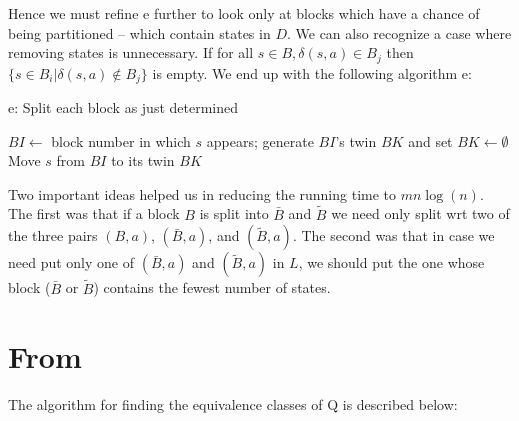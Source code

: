 Hence we must refine e further to look only at blocks which have a chance of being partitioned -- which contain states in $D$. We can also recognize a case where removing states is unnecessary. If for all $s\in B,\delta(s,a)\in B_j$ then $\{s\in B_i|\delta(s,a)\notin B_j \}$ is empty. We end up with the following algorithm e:

\begin{algorithm}  
	\caption{e: Split each block as just determined} 
	\label{alg:splitBlocks_refine} 
	\begin{algorithmic}%
		\State $BI\gets$ block number in which $s$ appears;
		\Else 
				\State generate $BI$'s twin $BK$ and set $BK\gets\emptyset$
			\Else
				\State Move $s$ from $BI$ to its twin $BK$
			\EndIf
		\EndIf
	\end{algorithmic}   
\end{algorithm}

Two important ideas helped us in reducing the running time to $mn\log (n)$. The first was that if a block $B$ is split into $\bar{B}$ and $\tilde{B}$ we need only split wrt two of the three pairs $(B, a)$, $(\bar{B}, a)$, and $(\tilde{B}, a)$. The second was that in case we need put only one of $(\bar{B}, a)$ and $(\tilde{B}, a)$ in $L$, we should put the one whose block ($\bar{B}$ or $\tilde{B}$) contains the fewest number of states.

\section{From \cite{Hopcroft71}}

The algorithm for finding the equivalence classes of Q is described below:

